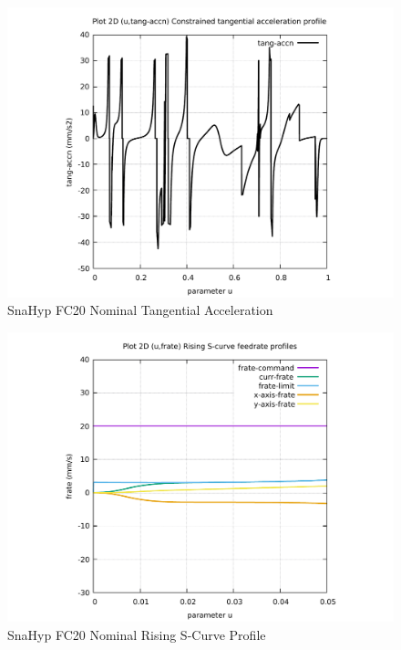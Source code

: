 \begin{figure}
	\caption     {SnaHyp FC20 Nominal Tangential Acceleration}
	\label{14-img-SnaHyp-FC20-Nominal-Tangential-Acceleration.pdf}
\includegraphics[width=1.00\textwidth]{Chap4/appendix/app-SnaHyp/plots/14-img-SnaHyp-FC20-Nominal-Tangential-Acceleration.pdf}
\end{figure}

\clearpage
\pagebreak

\begin{figure}
	\caption     {SnaHyp FC20 Nominal Rising S-Curve Profile}
	\label{15-img-SnaHyp-FC20-Nominal-Rising-S-Curve-Profile.pdf}
\includegraphics[width=1.00\textwidth]{Chap4/appendix/app-SnaHyp/plots/15-img-SnaHyp-FC20-Nominal-Rising-S-Curve-Profile.pdf}
\end{figure}


